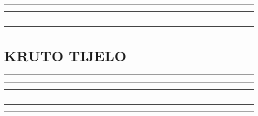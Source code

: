 \documentclass[10pt]{book}
\newcounter{zadatak} %
\newcounter{cjelina}
\begin{document}

\noindent
{\color{boja} \rule{\linewidth}{0.3mm} }




\vspace{1cm}

\noindent
{\color{boja} \rule{\linewidth}{0.3mm} }



\vspace{1cm}

\noindent
{\color{boja} \rule{\linewidth}{0.3mm} }


\vspace{1cm}

\noindent
{\color{boja} \rule{\linewidth}{0.3mm} }



\newpage
\chapter{KRUTO TIJELO}
\setcounter{zadatak}{0}



\noindent
{\color{boja} \rule{\linewidth}{0.3mm} }

\vspace{0.2cm} 



\noindent
{\color{boja} \rule{\linewidth}{0.3mm} }

\vspace{0.2cm}




\noindent
{\color{boja} \rule{\linewidth}{0.3mm} }


\vspace{1cm}

\noindent
{\color{boja} \rule{\linewidth}{0.3mm} }



\vspace{1cm}

\noindent
{\color{boja} \rule{\linewidth}{0.3mm} }


\vspace{1cm}

\noindent
{\color{boja} \rule{\linewidth}{0.3mm} }

\end{document}
